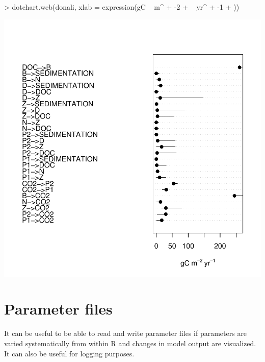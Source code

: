 \documentclass{scrartcl}
\begin{document}
\begin{Schunk}
\begin{Sinput}
> dotchart.web(donali, xlab = expression(gC ~ m^{
+     -2
+ } ~ yr^{
+     -1
+ }))
\end{Sinput}
\end{Schunk}
\includegraphics{figures/f-inverseranges}
\section{Parameter files}

It can be useful to be able to read and write parameter files if parameters are
varied systematically from within R and changes in model output are visualized. It can also be
useful for logging purposes.  
\end{document}
